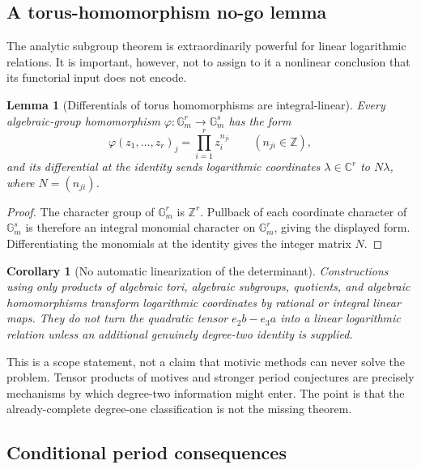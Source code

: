 \documentclass[11pt]{article}
\newtheorem{lemma}[theorem]{Lemma}
\newtheorem{corollary}[theorem]{Corollary}
\theoremstyle{definition}
\theoremstyle{remark}
\newcommand{\Z}{\mathbb{Z}}
\newcommand{\C}{\mathbb{C}}
\newcommand{\Gm}{\mathbb{G}_{m}}
\begin{document}
\subsection{A torus-homomorphism no-go lemma}

The analytic subgroup theorem is extraordinarily powerful for linear logarithmic relations.
It is important, however, not to assign to it a nonlinear conclusion that its functorial
input does not encode.

\begin{lemma}[Differentials of torus homomorphisms are integral-linear]
\label{lem:torus-linear}
Every algebraic-group homomorphism
$\varphi:\Gm^r\to\Gm^s$ has the form
\[
 \varphi(z_1,\ldots,z_r)_j=\prod_{i=1}^r z_i^{n_{ji}}
 \qquad(n_{ji}\in\Z),
\]
and its differential at the identity sends logarithmic coordinates
$\lambda\in\C^r$ to $N\lambda$, where $N=(n_{ji})$.
\end{lemma}

\begin{proof}
The character group of $\Gm^r$ is $\Z^r$.  Pullback of each coordinate character of
$\Gm^s$ is therefore an integral monomial character on $\Gm^r$, giving the displayed form.
Differentiating the monomials at the identity gives the integer matrix $N$.
\end{proof}

\begin{corollary}[No automatic linearization of the determinant]
\label{cor:no-automatic-linearization}
Constructions using only products of algebraic tori, algebraic subgroups, quotients, and
algebraic homomorphisms transform logarithmic coordinates by rational or integral linear
maps.  They do not turn the quadratic tensor
$e_2b-e_3a$ into a linear logarithmic relation unless an additional genuinely degree-two
identity is supplied.
\end{corollary}

This is a scope statement, not a claim that motivic methods can never solve the problem.
Tensor products of motives and stronger period conjectures are precisely mechanisms by which
degree-two information might enter.  The point is that the already-complete degree-one
classification is not the missing theorem.

\subsection{Conditional period consequences}
\end{document}
